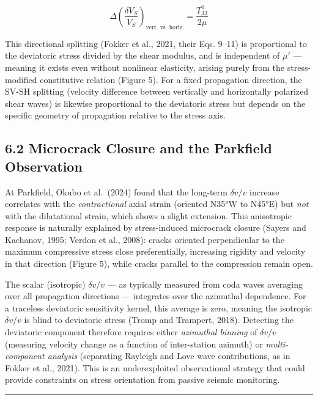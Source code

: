 \documentclass[draft]{agujournal2019}
\begin{document}
\[\Delta\left(\frac{\delta V_S}{V_S}\right)_{\text{vert. vs. horiz.}} = \frac{T_{33}^0}{2\mu} \tag{11b}\]

This directional splitting (Fokker et al., 2021, their Eqs. 9--11) is
proportional to the deviatoric stress divided by the shear modulus, and
is independent of \(\mu'\) --- meaning it exists even without nonlinear
elasticity, arising purely from the stress-modified constitutive
relation (Figure 5). For a fixed propagation direction, the SV-SH
splitting (velocity difference between vertically and horizontally
polarized shear waves) is likewise proportional to the deviatoric stress
but depends on the specific geometry of propagation relative to the
stress axis.

\subsection{6.2 Microcrack Closure and the Parkfield
Observation}\label{microcrack-closure-and-the-parkfield-observation}

At Parkfield, Okubo et al.~(2024) found that the long-term
\(\delta v/v\) increase correlates with the \emph{contractional} axial
strain (oriented N35°W to N45°E) but \emph{not} with the dilatational
strain, which shows a slight extension. This anisotropic response is
naturally explained by stress-induced microcrack closure (Sayers and
Kachanov, 1995; Verdon et al., 2008): cracks oriented perpendicular to
the maximum compressive stress close preferentially, increasing rigidity
and velocity in that direction (Figure 5), while cracks parallel to the
compression remain open.

The scalar (isotropic) \(\delta v/v\) --- as typically measured from
coda waves averaging over all propagation directions --- integrates over
the azimuthal dependence. For a traceless deviatoric sensitivity kernel,
this average is zero, meaning the isotropic \(\delta v/v\) is blind to
deviatoric stress (Tromp and Trampert, 2018). Detecting the deviatoric
component therefore requires either \emph{azimuthal binning} of
\(\delta v/v\) (measuring velocity change as a function of inter-station
azimuth) or \emph{multi-component analysis} (separating Rayleigh and
Love wave contributions, as in Fokker et al., 2021). This is an
underexploited observational strategy that could provide constraints on
stress orientation from passive seismic monitoring.

\begin{center}\rule{0.5\linewidth}{0.5pt}\end{center}
\end{document}
